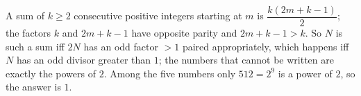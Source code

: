 A sum of $k\ge2$ consecutive positive integers starting at $m$ is $\dfrac{k(2m+k-1)}{2}$; the factors $k$ and $2m+k-1$ have opposite parity and $2m+k-1>k$. So $N$ is such a sum iff $2N$ has an odd factor $>1$ paired appropriately, which happens iff $N$ has an odd divisor greater than $1$; the numbers that cannot be written are exactly the powers of $2$. Among the five numbers only $512=2^9$ is a power of $2$, so the answer is $\boxed{1}$.
